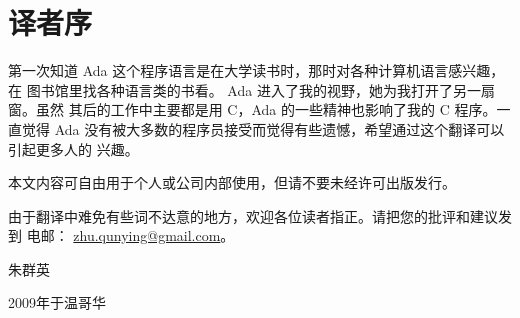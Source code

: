 \chapter{译者序}
\pagestyle{empty}

第一次知道 Ada 这个程序语言是在大学读书时，那时对各种计算机语言感兴趣，在
图书馆里找各种语言类的书看。 Ada 进入了我的视野，她为我打开了另一扇窗。虽然
其后的工作中主要都是用 C，Ada 的一些精神也影响了我的 C 程序。一直觉得 Ada
没有被大多数的程序员接受而觉得有些遗憾，希望通过这个翻译可以引起更多人的
兴趣。

本文内容可自由用于个人或公司内部使用，但请不要未经许可出版发行。

由于翻译中难免有些词不达意的地方，欢迎各位读者指正。请把您的批评和建议发到
电邮： \url{zhu.qunying@gmail.com}。

\vspace{5em}
\begin{flushright}
朱群英

2009年于温哥华
\end{flushright}



